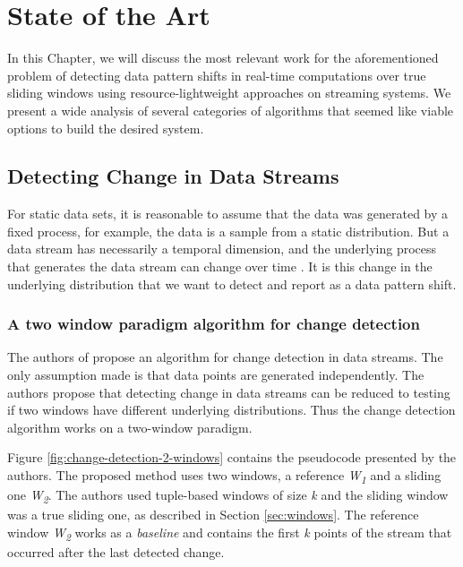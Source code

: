 \chapter{State of the Art} \label{chap:sota} \minitoc

In this Chapter, we will discuss the most relevant work for the aforementioned problem of detecting data pattern shifts in real-time computations over true sliding windows using resource-lightweight approaches on streaming systems. We present a wide analysis of several categories of algorithms that seemed like viable options to build the desired system.

\section{Detecting Change in Data Streams} \label{sec:change-detect}

For static data sets, it is reasonable to assume that the data was generated by a fixed process, for example, the data is a sample from a static distribution. But a data stream has necessarily a temporal dimension, and the underlying process that generates the data stream can change over time \cite{Aggarwal-Evolving-Data-Streams} \cite{Domingos-Mining-Time-Data-Streams}. It is this change in the underlying distribution that we want to detect and report as a data pattern shift.

\subsection*{A two window paradigm algorithm for change detection}
\label{subsec:2-window}

The authors of \cite{Kifer-Detecting-Change} propose an algorithm for change detection in data streams. The only assumption made is that data points are generated independently. The authors propose that detecting change in data streams can be reduced to testing if two windows have different underlying distributions. Thus the change detection algorithm works on a two-window paradigm.

Figure \ref{fig:change-detection-2-windows} contains the pseudocode presented by the authors. The proposed method uses two windows, a reference \textit{W\textsubscript{1}} and a sliding one \textit{W\textsubscript{2}}. The authors used tuple-based windows of size \textit{k} and the sliding window was a true sliding one, as described in Section \ref{sec:windows}. The reference window \textit{W\textsubscript{2}} works as a \textit{baseline} and contains the first \textit{k} points of the stream that occurred after the last detected change.

